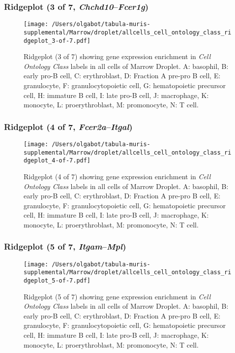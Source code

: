 \clearpage

\subsubsection{Ridgeplot (3 of 7, \emph{Chchd10}--\emph{Fcer1g})}
\begin{figure}[h]
\centering
\texttt{[image: /Users/olgabot/tabula-muris-supplemental/Marrow/droplet/allcells\_cell\_ontology\_class\_ridgeplot\_3-of-7.pdf]}

\caption{ Ridgeplot (3 of 7)  showing gene expression enrichment in \emph{Cell Ontology Class} labels in all cells of Marrow Droplet. A: basophil, B: early pro-B cell, C: erythroblast, D: Fraction A pre-pro B cell, E: granulocyte, F: granulocytopoietic cell, G: hematopoietic precursor cell, H: immature B cell, I: late pro-B cell, J: macrophage, K: monocyte, L: proerythroblast, M: promonocyte, N: T cell.}
\end{figure}


\clearpage

\subsubsection{Ridgeplot (4 of 7, \emph{Fcer2a}--\emph{Itgal})}
\begin{figure}[h]
\centering
\texttt{[image: /Users/olgabot/tabula-muris-supplemental/Marrow/droplet/allcells\_cell\_ontology\_class\_ridgeplot\_4-of-7.pdf]}

\caption{ Ridgeplot (4 of 7)  showing gene expression enrichment in \emph{Cell Ontology Class} labels in all cells of Marrow Droplet. A: basophil, B: early pro-B cell, C: erythroblast, D: Fraction A pre-pro B cell, E: granulocyte, F: granulocytopoietic cell, G: hematopoietic precursor cell, H: immature B cell, I: late pro-B cell, J: macrophage, K: monocyte, L: proerythroblast, M: promonocyte, N: T cell.}
\end{figure}


\clearpage

\subsubsection{Ridgeplot (5 of 7, \emph{Itgam}--\emph{Mpl})}
\begin{figure}[h]
\centering
\texttt{[image: /Users/olgabot/tabula-muris-supplemental/Marrow/droplet/allcells\_cell\_ontology\_class\_ridgeplot\_5-of-7.pdf]}

\caption{ Ridgeplot (5 of 7)  showing gene expression enrichment in \emph{Cell Ontology Class} labels in all cells of Marrow Droplet. A: basophil, B: early pro-B cell, C: erythroblast, D: Fraction A pre-pro B cell, E: granulocyte, F: granulocytopoietic cell, G: hematopoietic precursor cell, H: immature B cell, I: late pro-B cell, J: macrophage, K: monocyte, L: proerythroblast, M: promonocyte, N: T cell.}
\end{figure}


